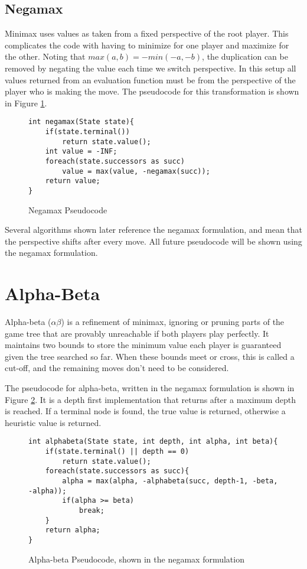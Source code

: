 \subsection{Negamax}

Minimax uses values as taken from a fixed perspective of the root player. This complicates the code with having to minimize for one player and maximize for the other. Noting that $max(a,b) = −min(−a,-b)$, the duplication can be removed by negating the value each time we switch perspective. In this setup all values returned from an evaluation function must be from the perspective of the player who is making the move. The pseudocode for this transformation is shown in Figure \ref{fig:negamaxcode}.

\begin{figure}

\begin{lstlisting}
int negamax(State state){
	if(state.terminal())
		return state.value();
	int value = -INF;
	foreach(state.successors as succ)
		value = max(value, -negamax(succ));
	return value;
}
\end{lstlisting}

\caption{Negamax Pseudocode}
\label{fig:negamaxcode}
\end{figure}

Several algorithms shown later reference the negamax formulation, and mean that the perspective shifts after every move. All future pseudocode will be shown using the negamax formulation.


\section{Alpha-Beta}\label{sec:alphabeta}

Alpha-beta ($\alpha\beta$) is a refinement of minimax, ignoring or pruning parts of the game tree that are provably unreachable if both players play perfectly. It maintains two bounds to store the minimum value each player is guaranteed given the tree searched so far. When these bounds meet or cross, this is called a cut-off, and the remaining moves don't need to be considered. 

The pseudocode for alpha-beta, written in the negamax formulation is shown in Figure \ref{fig:abcode}. It is a depth first implementation that returns after a maximum depth is reached. If a terminal node is found, the true value is returned, otherwise a heuristic value is returned.

\begin{figure}

\begin{lstlisting}
int alphabeta(State state, int depth, int alpha, int beta){
	if(state.terminal() || depth == 0)
		return state.value();
	foreach(state.successors as succ){
		alpha = max(alpha, -alphabeta(succ, depth-1, -beta, -alpha));
		if(alpha >= beta)
			break;
	}
	return alpha;
}
\end{lstlisting}

\caption{Alpha-beta Pseudocode, shown in the negamax formulation}
\label{fig:abcode}
\end{figure}

